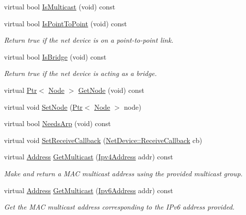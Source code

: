 \begin{DoxyCompactItemize}
virtual bool \hyperlink{classns3_1_1LteNetDevice_a0cde5a12328f12384ffb6785c8c0cb19}{Is\+Multicast} (void) const 
\item 
virtual bool \hyperlink{classns3_1_1LteNetDevice_a474c368411c739143158a47bc52753a3}{Is\+Point\+To\+Point} (void) const 
\begin{DoxyCompactList}\small\item\em Return true if the net device is on a point-\/to-\/point link. \end{DoxyCompactList}\item 
virtual bool \hyperlink{classns3_1_1LteNetDevice_aa21e46db4bc0934157c2f23d9c6ba1dd}{Is\+Bridge} (void) const 
\begin{DoxyCompactList}\small\item\em Return true if the net device is acting as a bridge. \end{DoxyCompactList}\item 
virtual \hyperlink{classns3_1_1Ptr}{Ptr}$<$ \hyperlink{classns3_1_1Node}{Node} $>$ \hyperlink{classns3_1_1LteNetDevice_a3285ea84aa99192514ec78f39b29eca4}{Get\+Node} (void) const 
\item 
virtual void \hyperlink{classns3_1_1LteNetDevice_aafbebcccd5e014ea827967cd9c77e79c}{Set\+Node} (\hyperlink{classns3_1_1Ptr}{Ptr}$<$ \hyperlink{classns3_1_1Node}{Node} $>$ node)
\item 
virtual bool \hyperlink{classns3_1_1LteNetDevice_a549366f20d94d9af083f8a8e6b559b4a}{Needs\+Arp} (void) const 
\item 
virtual void \hyperlink{classns3_1_1LteNetDevice_a0ae8081991e84e5abfc26e597dad729d}{Set\+Receive\+Callback} (\hyperlink{classns3_1_1NetDevice_ad5e5e1ca187472bc2ba99575d8def568}{Net\+Device\+::\+Receive\+Callback} cb)
\item 
virtual \hyperlink{classns3_1_1Address}{Address} \hyperlink{classns3_1_1LteNetDevice_adb52b543c1bdd8bf9dfa8a164b0274f3}{Get\+Multicast} (\hyperlink{classns3_1_1Ipv4Address}{Ipv4\+Address} addr) const 
\begin{DoxyCompactList}\small\item\em Make and return a M\+AC multicast address using the provided multicast group. \end{DoxyCompactList}\item 
virtual \hyperlink{classns3_1_1Address}{Address} \hyperlink{classns3_1_1LteNetDevice_afe8f8834eb36de888d5d6e02805c444c}{Get\+Multicast} (\hyperlink{classns3_1_1Ipv6Address}{Ipv6\+Address} addr) const 
\begin{DoxyCompactList}\small\item\em Get the M\+AC multicast address corresponding to the I\+Pv6 address provided. \end{DoxyCompactList}\item 

\end{DoxyCompactItemize}
